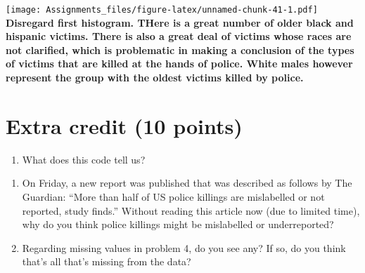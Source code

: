 \documentclass[
]{article}
\newenvironment{Shaded}{\begin{snugshade}}{\end{snugshade}}
\newcommand{\AttributeTok}[1]{\textcolor[rgb]{0.77,0.63,0.00}{#1}}
\newcommand{\CommentTok}[1]{\textcolor[rgb]{0.56,0.35,0.01}{\textit{#1}}}
\newcommand{\ConstantTok}[1]{\textcolor[rgb]{0.00,0.00,0.00}{#1}}
\newcommand{\DecValTok}[1]{\textcolor[rgb]{0.00,0.00,0.81}{#1}}
\newcommand{\FunctionTok}[1]{\textcolor[rgb]{0.00,0.00,0.00}{#1}}
\newcommand{\NormalTok}[1]{#1}
\newcommand{\OtherTok}[1]{\textcolor[rgb]{0.56,0.35,0.01}{#1}}
\newcommand{\SpecialCharTok}[1]{\textcolor[rgb]{0.00,0.00,0.00}{#1}}
\newcommand{\StringTok}[1]{\textcolor[rgb]{0.31,0.60,0.02}{#1}}
\providecommand{\tightlist}{%
  \setlength{\itemsep}{0pt}\setlength{\parskip}{0pt}}
\begin{document}
\begin{Shaded}
\end{Shaded}

\texttt{[image: Assignments\_files/figure-latex/unnamed-chunk-41-1.pdf]}
\textbf{Disregard first histogram. THere is a great number of older
black and hispanic victims. There is also a great deal of victims whose
races are not clarified, which is problematic in making a conclusion of
the types of victims that are killed at the hands of police. White males
however represent the group with the oldest victims killed by police. }

\hypertarget{extra-credit-10-points}{%
\section{Extra credit (10 points)}\label{extra-credit-10-points}}

\begin{enumerate}
\def\labelenumi{\alph{enumi}.}
\tightlist
\item
  What does this code tell us?
\end{enumerate}

\begin{Shaded}
\end{Shaded}

\begin{enumerate}
\def\labelenumi{\alph{enumi}.}
\setcounter{enumi}{1}
\item
  On Friday, a new report was published that was described as follows by
  The Guardian: ``More than half of US police killings are mislabelled
  or not reported, study finds.'' Without reading this article now (due
  to limited time), why do you think police killings might be
  mislabelled or underreported?
\item
  Regarding missing values in problem 4, do you see any? If so, do you
  think that's all that's missing from the data?
\end{enumerate}
\end{document}
